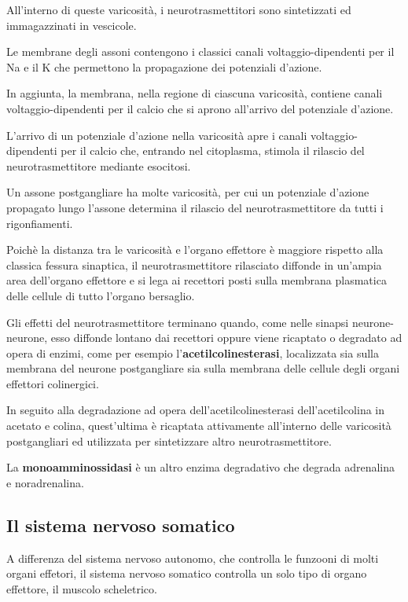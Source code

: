 \documentclass[]{article}
\begin{document}
All'interno di queste varicosità, i neurotrasmettitori sono sintetizzati
ed immagazzinati in vescicole.

Le membrane degli assoni contengono i classici canali
voltaggio-dipendenti per il Na e il K che permettono la propagazione dei
potenziali d'azione.

In aggiunta, la membrana, nella regione di ciascuna varicosità, contiene
canali voltaggio-dipendenti per il calcio che si aprono all'arrivo del
potenziale d'azione.

L'arrivo di un potenziale d'azione nella varicosità apre i canali
voltaggio-dipendenti per il calcio che, entrando nel citoplasma, stimola
il rilascio del neurotrasmettitore mediante esocitosi.

Un assone postgangliare ha molte varicosità, per cui un potenziale
d'azione propagato lungo l'assone determina il rilascio del
neurotrasmettitore da tutti i rigonfiamenti.

Poichè la distanza tra le varicosità e l'organo effettore è maggiore
rispetto alla classica fessura sinaptica, il neurotrasmettitore
rilasciato diffonde in un'ampia area dell'organo effettore e si lega ai
recettori posti sulla membrana plasmatica delle cellule di tutto
l'organo bersaglio.

Gli effetti del neurotrasmettitore terminano quando, come nelle sinapsi
neurone-neurone, esso diffonde lontano dai recettori oppure viene
ricaptato o degradato ad opera di enzimi, come per esempio
l'\textbf{acetilcolinesterasi}, localizzata sia sulla membrana del
neurone postgangliare sia sulla membrana delle cellule degli organi
effettori colinergici.

In seguito alla degradazione ad opera dell'acetilcolinesterasi
dell'acetilcolina in acetato e colina, quest'ultima è ricaptata
attivamente all'interno delle varicosità postgangliari ed utilizzata per
sintetizzare altro neurotrasmettitore.

La \textbf{monoamminossidasi} è un altro enzima degradativo che degrada
adrenalina e noradrenalina.

\subsection{Il sistema nervoso
somatico}\label{il-sistema-nervoso-somatico}

A differenza del sistema nervoso autonomo, che controlla le funzooni di
molti organi effetori, il sistema nervoso somatico controlla un solo
tipo di organo effettore, il muscolo scheletrico.
\end{document}
